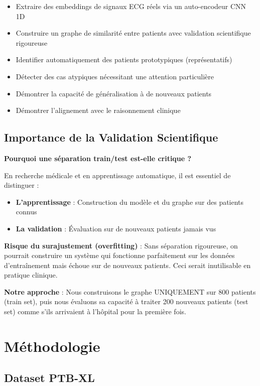 \documentclass[12pt,a4paper]{article}
\begin{document}
\begin{itemize}
    \item Extraire des embeddings de signaux ECG réels via un auto-encodeur CNN 1D
    \item Construire un graphe de similarité entre patients avec validation scientifique rigoureuse
    \item Identifier automatiquement des patients prototypiques (représentatifs)
    \item Détecter des cas atypiques nécessitant une attention particulière
    \item Démontrer la capacité de généralisation à de nouveaux patients
    \item Démontrer l'alignement avec le raisonnement clinique
\end{itemize}

\subsection{Importance de la Validation Scientifique}

\textbf{Pourquoi une séparation train/test est-elle critique ?}

En recherche médicale et en apprentissage automatique, il est essentiel de distinguer :
\begin{itemize}
    \item \textbf{L'apprentissage} : Construction du modèle et du graphe sur des patients connus
    \item \textbf{La validation} : Évaluation sur de nouveaux patients jamais vus
\end{itemize}

\textbf{Risque du surajustement (overfitting)} : Sans séparation rigoureuse, on pourrait construire un système qui fonctionne parfaitement sur les données d'entraînement mais échoue sur de nouveaux patients. Ceci serait inutilisable en pratique clinique.

\textbf{Notre approche} : Nous construisons le graphe UNIQUEMENT sur 800 patients (train set), puis nous évaluons sa capacité à traiter 200 nouveaux patients (test set) comme s'ils arrivaient à l'hôpital pour la première fois.

\section{Méthodologie}

\subsection{Dataset PTB-XL}
\end{document}

